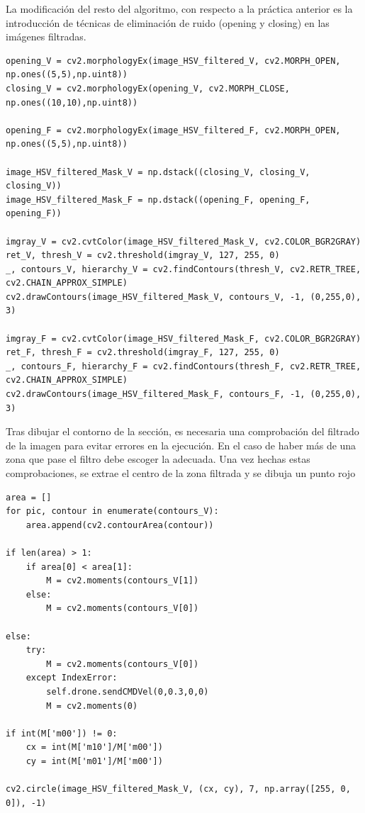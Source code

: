 La modificación del resto del algoritmo, con respecto a la práctica anterior es la introducción de técnicas de eliminación de ruido (opening y closing) en las imágenes filtradas. 

\lstset{language=Python, breaklines=true, basicstyle=\footnotesize}
\begin{lstlisting}[frame=single]
opening_V = cv2.morphologyEx(image_HSV_filtered_V, cv2.MORPH_OPEN, np.ones((5,5),np.uint8))
closing_V = cv2.morphologyEx(opening_V, cv2.MORPH_CLOSE, np.ones((10,10),np.uint8))

opening_F = cv2.morphologyEx(image_HSV_filtered_F, cv2.MORPH_OPEN, np.ones((5,5),np.uint8))

image_HSV_filtered_Mask_V = np.dstack((closing_V, closing_V, closing_V))
image_HSV_filtered_Mask_F = np.dstack((opening_F, opening_F, opening_F))

imgray_V = cv2.cvtColor(image_HSV_filtered_Mask_V, cv2.COLOR_BGR2GRAY)
ret_V, thresh_V = cv2.threshold(imgray_V, 127, 255, 0)
_, contours_V, hierarchy_V = cv2.findContours(thresh_V, cv2.RETR_TREE, cv2.CHAIN_APPROX_SIMPLE)
cv2.drawContours(image_HSV_filtered_Mask_V, contours_V, -1, (0,255,0), 3)

imgray_F = cv2.cvtColor(image_HSV_filtered_Mask_F, cv2.COLOR_BGR2GRAY)
ret_F, thresh_F = cv2.threshold(imgray_F, 127, 255, 0)
_, contours_F, hierarchy_F = cv2.findContours(thresh_F, cv2.RETR_TREE, cv2.CHAIN_APPROX_SIMPLE)
cv2.drawContours(image_HSV_filtered_Mask_F, contours_F, -1, (0,255,0), 3)
\end{lstlisting}

Tras dibujar el contorno de la sección, es necesaria una comprobación del filtrado de la imagen para evitar errores en la ejecución. En el caso de haber más de una zona que pase el filtro debe escoger la adecuada. Una vez hechas estas comprobaciones, se extrae el centro de la zona filtrada y se dibuja un punto rojo

\lstset{language=Python, breaklines=true, basicstyle=\footnotesize}
\begin{lstlisting}[frame=single]
area = []
for pic, contour in enumerate(contours_V):
    area.append(cv2.contourArea(contour))

if len(area) > 1:
    if area[0] < area[1]:
        M = cv2.moments(contours_V[1])
    else:
        M = cv2.moments(contours_V[0])

else:
    try:
        M = cv2.moments(contours_V[0])
    except IndexError:
        self.drone.sendCMDVel(0,0.3,0,0)
        M = cv2.moments(0)

if int(M['m00']) != 0:
    cx = int(M['m10']/M['m00'])
    cy = int(M['m01']/M['m00'])

cv2.circle(image_HSV_filtered_Mask_V, (cx, cy), 7, np.array([255, 0, 0]), -1)
\end{lstlisting}

